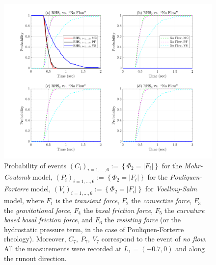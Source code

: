\documentclass{article}
\begin{document}
\begin{figure}[H]
        \centering
        \includegraphics[width=1\textwidth]{InclinedPlane/Dominance1/DominancePrX_L1.png}
        \caption{Probability of events $(C_i)_{i=1,...,6}:=\left\{\Phi_2=|F_i|\right\}$ for the \emph{Mohr-Coulomb} model, $(P_i)_{i=1,...,6}:=\left\{\Phi_2=|F_i|\right\}$ for the \emph{Pouliquen-Forterre} model, $(V_i)_{i=1,...,6}:=\left\{\Phi_2=|F_i|\right\}$ for \emph{Voellmy-Salm} model, where $F_1$ is the \emph{transient force}, $F_2$ the \emph{convective force}, $F_3$ the \emph{gravitational force}, $F_4$ the \emph{basal friction force}, $F_5$ the \emph{curvature based basal friction force}, and $F_6$ the \emph{resisting force} (or the hydrostatic pressure term, in the case of Pouliquen-Forterre rheology). Moreover, $C_7,\ P_7,\ V_7$ correspond to the event of \emph{no flow}. All the measurements were recorded at $L_1=(-0.7,0)$ and along the runout direction.}
        \label{fig:Ramp-FXDominance1-L1}
\end{figure}
\end{document}
